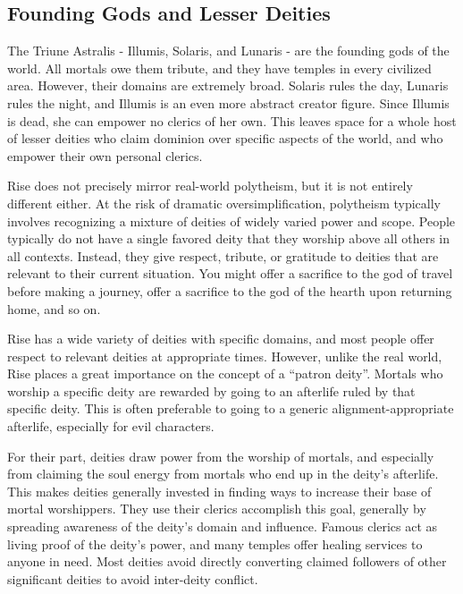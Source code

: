   \subsection{Founding Gods and Lesser Deities}
    The Triune Astralis - Illumis, Solaris, and Lunaris - are the founding gods of the world.
    All mortals owe them tribute, and they have temples in every civilized area.
    However, their domains are extremely broad.
    Solaris rules the day, Lunaris rules the night, and Illumis is an even more abstract creator figure.
    Since Illumis is dead, she can empower no clerics of her own.
    This leaves space for a whole host of lesser deities who claim dominion over specific aspects of the world, and who empower their own personal clerics.

    Rise does not precisely mirror real-world polytheism, but it is not entirely different either.
    At the risk of dramatic oversimplification, polytheism typically involves recognizing a mixture of deities of widely varied power and scope.
    People typically do not have a single favored deity that they worship above all others in all contexts.
    Instead, they give respect, tribute, or gratitude to deities that are relevant to their current situation.
    You might offer a sacrifice to the god of travel before making a journey, offer a sacrifice to the god of the hearth upon returning home, and so on.

    Rise has a wide variety of deities with specific domains, and most people offer respect to relevant deities at appropriate times.
    However, unlike the real world, Rise places a great importance on the concept of a ``patron deity''.
    Mortals who worship a specific deity are rewarded by going to an afterlife ruled by that specific deity.
    This is often preferable to going to a generic alignment-appropriate afterlife, especially for evil characters.

    For their part, deities draw power from the worship of mortals, and especially from claiming the soul energy from mortals who end up in the deity's afterlife.
    This makes deities generally invested in finding ways to increase their base of mortal worshippers.
    They use their clerics accomplish this goal, generally by spreading awareness of the deity's domain and influence.
    Famous clerics act as living proof of the deity's power, and many temples offer healing services to anyone in need.
    Most deities avoid directly converting claimed followers of other significant deities to avoid inter-deity conflict.

